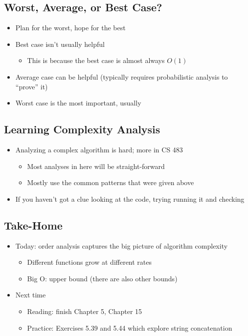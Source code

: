 \documentclass[10pt]{article}
\begin{document}
\subsection*{Worst, Average, or Best Case?}
\begin{itemize}
\item Plan for the worst, hope for the best
\item Best case isn't usually helpful
\begin{itemize}
\item This is because the best case is almost always $O(1)$
\end{itemize}
\item Average case can be helpful (typically requires probabilistic analysis to ``prove'' it)
\item Worst case is the most important, usually
\end{itemize}

\subsection*{Learning Complexity Analysis}
\begin{itemize}
\item Analyzing a complex algorithm is hard; more in CS 483
\begin{itemize}
\item Most analyses in here will be straight-forward
\item Mostly use the common patterns that were given above
\end{itemize}
\item If you haven't got a clue looking at the code, trying running it and checking
\end{itemize}

\subsection*{Take-Home}
\begin{itemize}
\item Today: order analysis captures the big picture of algorithm complexity
\begin{itemize}
\item Different functions grow at different rates
\item Big O: upper bound (there are also other bounds)
\end{itemize}
\item Next time
\begin{itemize}
\item Reading: finish Chapter 5, Chapter 15
\item Practice: Exercises 5.39 and 5.44 which explore string concatenation
\end{itemize}
\end{itemize}
\end{document}
